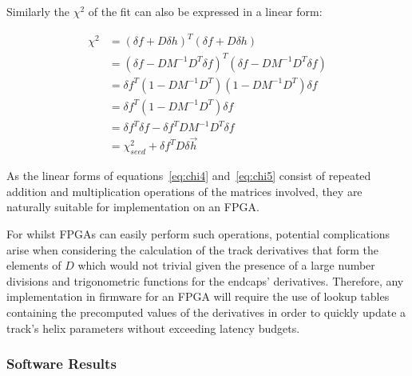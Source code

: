 Similarly the $\chi^{2}$ of the fit can also be expressed in a linear form:

\begin{equation}
\begin{split}
\chi^{2} &= (\delta f + D \delta h)^{T}(\delta f + D \delta h) \\
         &= (\delta f - DM^{-1}D^{T}\delta f)^{T} (\delta f - DM^{-1}D^{T}\delta f) \\
         &= \delta f^{T} (1- DM^{-1}D^{T}) (1- DM^{-1}D^{T}) \delta f \\
         &= \delta f^{T} (1- DM^{-1}D^{T}) \delta f \\
         &= \delta f^{T} \delta f - \delta f^{T} DM^{-1}D^{T} \delta f \\
         &= \chi^{2}_{seed} + \delta f^{T} D \delta \overrightarrow{h} 
\end{split}
\label{eq:chi5}
\end{equation}

As the linear forms of equations~\ref{eq:chi4} and~\ref{eq:chi5} consist of repeated addition and multiplication operations of the matrices involved, they are naturally suitable for implementation on an FPGA.

For whilst FPGAs can easily perform such operations, potential complications arise when considering the calculation of the track derivatives that form the elements of $D$ which would not trivial given the presence of a large number divisions and trigonometric functions for the endcaps' derivatives.
Therefore, any implementation in firmware for an FPGA will require the use of lookup tables containing the precomputed values of the derivatives in order to quickly update a track's helix parameters without exceeding latency budgets.

\subsubsection{Software Results}\label{subsubsec:chi2software}

